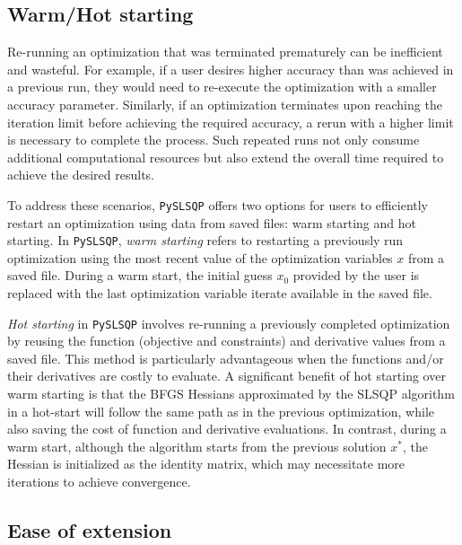 \documentclass[
]{article}
\begin{document}
\subsection{Warm/Hot starting}\label{warmhot-starting}

Re-running an optimization that was terminated prematurely can be
inefficient and wasteful. For example, if a user desires higher accuracy
than was achieved in a previous run, they would need to re-execute the
optimization with a smaller accuracy parameter. Similarly, if an
optimization terminates upon reaching the iteration limit before
achieving the required accuracy, a rerun with a higher limit is
necessary to complete the process. Such repeated runs not only consume
additional computational resources but also extend the overall time
required to achieve the desired results.

To address these scenarios, \texttt{PySLSQP} offers two options for
users to efficiently restart an optimization using data from saved
files: warm starting and hot starting. In \texttt{PySLSQP}, \emph{warm
starting} refers to restarting a previously run optimization using the
most recent value of the optimization variables \(x\) from a saved file.
During a warm start, the initial guess \(x_0\) provided by the user is
replaced with the last optimization variable iterate available in the
saved file.

\emph{Hot starting} in \texttt{PySLSQP} involves re-running a previously
completed optimization by reusing the function (objective and
constraints) and derivative values from a saved file. This method is
particularly advantageous when the functions and/or their derivatives
are costly to evaluate. A significant benefit of hot starting over warm
starting is that the BFGS Hessians approximated by the SLSQP algorithm
in a hot-start will follow the same path as in the previous
optimization, while also saving the cost of function and derivative
evaluations. In contrast, during a warm start, although the algorithm
starts from the previous solution \(x^*\), the Hessian is initialized as
the identity matrix, which may necessitate more iterations to achieve
convergence.

\subsection{Ease of extension}\label{ease-of-extension}
\end{document}
